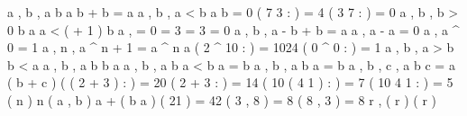 \forall a , b \in {} ,\; a \ge b \implies a \mathbin{\dot{-}} b + b = a
\forall a , b \in {} ,\; a < b \implies a \mathbin{\dot{-}} b = 0
( 7 \mathbin{\dot{-}} 3 :  ) = 4 \land ( 3 \mathbin{\dot{-}} 7 :  ) = 0
\forall a , b \in {} ,\; b > 0 \implies \left\lfloor {} \right\rfloor \cdot b \le a \land a < ( \left\lfloor {} \right\rfloor + 1 ) \cdot b
\forall a \in {} ,\; \left\lfloor {} \right\rfloor = 0
\left\lfloor {} \right\rfloor = 3 \land \left\lfloor {} \right\rfloor = 3 \land \left\lfloor {} \right\rfloor = 0
\forall a , b \in {} ,\; a - b + b = a
\forall a \in {} ,\; a - a = 0
\forall a \in {} ,\; a ^{ 0 } = 1
\forall a , n \in {} ,\; a ^{ n + 1 } = a ^{ n } \cdot a
( 2 ^{ 10 } :  ) = 1024 \land ( 0 ^{ 0 } :  ) = 1
\forall a , b \in {} ,\; a > b \iff b < a
\forall a , b \in {} ,\; a \ge b \iff b \le a
\forall a , b \in {} ,\; a \le b \iff a < b \lor a = b
\forall a , b \in {} ,\; a \neq b \iff \neg a = b
\forall a , b , c \in {} ,\; a \mathbin{\dot{-}} b \mathbin{\dot{-}} c = a \mathbin{\dot{-}} ( b + c )
( ( 2 + 3 )  :  ) = 20 \land ( 2 + 3  :  ) = 14 \land ( 10 \mathbin{\dot{-}} ( 4 \mathbin{\dot{-}} 1 ) :  ) = 7 \land ( 10 \mathbin{\dot{-}} 4 \mathbin{\dot{-}} 1 :  ) = 5
 ( n )  \cdot n
 ( a , b ) \coloneqq a + ( b \mathbin{\dot{-}} a )
 ( 21 ) = 42 \land {} ( 3 , 8 ) = 8 \land {} ( 8 , 3 ) = 8
\forall r \in {} ,\;  ( r ) \implies {} ( r )
